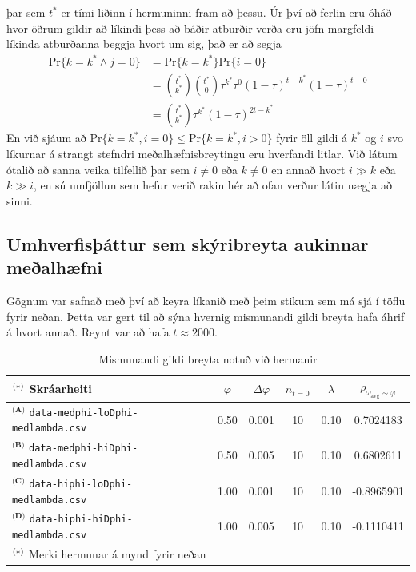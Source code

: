\documentclass[12pt]{article}
\begin{document}
þar sem $t^*$ er tími liðinn í hermuninni fram að þessu.
Úr því að ferlin eru óháð hvor öðrum gildir að líkindi þess að báðir atburðir verða eru jöfn margfeldi líkinda atburðanna beggja hvort um sig, það er að segja
\begin{align*}
   \mathrm{Pr}\{k = k^* \land j = 0\} &= \mathrm{Pr}\{k = k^*\} \mathrm{Pr}\{i = 0\} \\
                               &= {t^* \choose k^*}{t^* \choose 0} \tau^{k^*} \tau^0 (1 - \tau)^{t - k^*} (1 - \tau)^{t - 0} \\
                               &= {t^* \choose k^*}\tau^{k^*} (1 - \tau)^{2t - k^*}
\end{align*}
En við sjáum að $\mathrm{Pr}\{k = k^*, i = 0\} \leq \mathrm{Pr}\{k = k^*, i > 0\}$ fyrir öll gildi á $k^*$ og $i$ svo líkurnar á strangt stefndri
meðalhæfnisbreytingu eru hverfandi litlar. Við látum ótalið að sanna veika tilfellið þar sem $i \neq 0$ eða $k \neq 0$ en annað hvort $i \gg k$ eða
$k \gg i$, en sú umfjöllun sem hefur verið rakin hér að ofan verður látin nægja að sinni.

\subsection{Umhverfisþáttur sem skýribreyta aukinnar meðalhæfni}
Gögnum var safnað með því að keyra líkanið með þeim stikum sem má sjá í töflu fyrir neðan.
Þetta var gert til að sýna hvernig mismunandi gildi breyta hafa áhrif á hvort annað. Reynt
var að hafa $t \approx 2000$.
\renewcommand{\arraystretch}{1.4}
\begin{table}[ht!]
    \centering
    \begin{tabular}{l c c c c|c}
        \hline
        $^\text{\text{(\textasteriskcentered)}}$ Skráarheiti                                & $\varphi$ & $\Delta \varphi$  & $n_{t = 0}$ & $\lambda$ & $\rho_{\omega_{\mathrm{avg}} \sim \varphi}$ \\
        \hline
        $^{\textbf{(A)}}$ \texttt{data-medphi-loDphi-medlambda.csv}  & 0.50      & 0.001             & 10          & 0.10       & 0.7024183  \\
        $^{\textbf{(B)}}$ \texttt{data-medphi-hiDphi-medlambda.csv}  & 0.50      & 0.005             & 10          & 0.10       & 0.6802611  \\
        $^{\textbf{(C)}}$ \texttt{data-hiphi-loDphi-medlambda.csv}   & 1.00      & 0.001             & 10          & 0.10       & -0.8965901 \\
        $^{\textbf{(D)}}$ \texttt{data-hiphi-hiDphi-medlambda.csv}   & 1.00      & 0.005             & 10          & 0.10       & -0.1110411 \\
        \hline
        \footnotesize{$^\text{\text{(\textasteriskcentered)}}$ Merki hermunar á mynd fyrir neðan }
    \end{tabular}
    \caption{Mismunandi gildi breyta notuð við hermanir}
\end{table}
\end{document}
